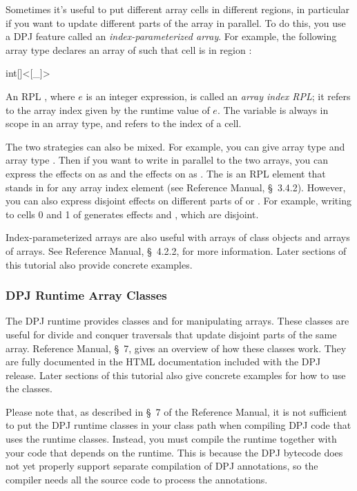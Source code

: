 Sometimes it's useful to put different array cells in different
regions, in particular if you want to update different parts of the
array in parallel.  To do this, you use a DPJ feature called an
\emph{index-parameterized array}.  For example, the following array
type declares an array of  such that cell  is in
region \kwd{[i]}:
%
\begin{dpjlisting}
int[]<[_]>
\end{dpjlisting}
%
An RPL \kwd{[$e$]}, where $e$ is an integer expression, is called an
\emph{array index RPL}; it refers to the array index given by the
runtime value of $e$.  The variable \kwd{\_} is always in scope in an
array type, and refers to the index of a cell.

The two strategies can also be mixed.  For example, you can give array
 type  and array  type
.  Then if you want to write in parallel to the
two arrays, you can express the effects on  as   and the effects on  as .  The
\kwd{[?]} is an RPL element that stands in for any array index element
(see Reference Manual, \S~3.4.2).  However, you can also express
disjoint effects on different parts of  or .  For
example, writing to cells 0 and 1 of  generates effects
 and , which are disjoint.

Index-parameterized arrays are also useful with arrays of class
objects and arrays of arrays.  See Reference Manual, \S~4.2.2, for
more information.  Later sections of this tutorial also provide
concrete examples.

\subsubsection{DPJ Runtime Array Classes}

The DPJ runtime provides classes  and 
for manipulating arrays.  These classes are useful for divide and
conquer traversals that update disjoint parts of the same array.
Reference Manual, \S~7, gives an overview of how these classes work.
They are fully documented in the HTML documentation included with the
DPJ release.  Later sections of this tutorial also give concrete
examples for how to use the classes.

Please note that, as described in \S~7 of the Reference Manual, it is
not sufficient to put the DPJ runtime classes in your class path when
compiling DPJ code that uses the runtime classes.  Instead, you must
compile the runtime together with your code that depends on the
runtime.  This is because the DPJ bytecode does not yet properly
support separate compilation of DPJ annotations, so the compiler needs
all the source code to process the annotations.
%

